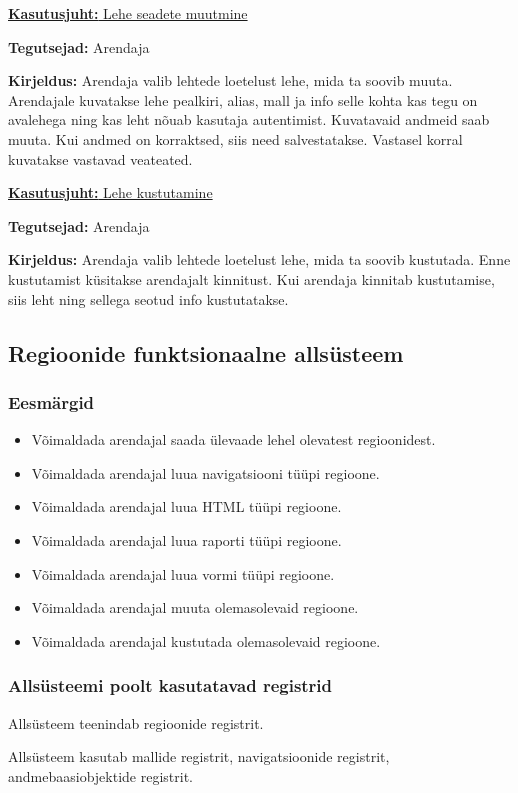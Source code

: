 \documentclass[a4paper,12pt]{article} %
\begin{document}
\underline{\textbf{Kasutusjuht:} Lehe seadete muutmine}
\par
\textbf{Tegutsejad:} Arendaja
\par
\textbf{Kirjeldus:} Arendaja valib lehtede loetelust lehe, mida ta soovib muuta. Arendajale kuvatakse lehe pealkiri, alias, mall ja info selle kohta kas tegu on avalehega ning kas leht nõuab kasutaja autentimist. Kuvatavaid andmeid saab muuta. Kui andmed on korraktsed, siis need salvestatakse. Vastasel korral kuvatakse vastavad veateated.
\par

\underline{\textbf{Kasutusjuht:} Lehe kustutamine}
\par
\textbf{Tegutsejad:} Arendaja
\par
\textbf{Kirjeldus:} Arendaja valib lehtede loetelust lehe, mida ta soovib kustutada. Enne kustutamist küsitakse arendajalt kinnitust. Kui arendaja kinnitab kustutamise, siis leht ning sellega seotud info kustutatakse.
\par

\subsection{Regioonide funktsionaalne allsüsteem}
\subsubsection{Eesmärgid}
\begin{itemize}
\item Võimaldada arendajal saada ülevaade lehel olevatest regioonidest.
\item Võimaldada arendajal luua navigatsiooni tüüpi regioone.
\item Võimaldada arendajal luua HTML tüüpi regioone.
\item Võimaldada arendajal luua raporti tüüpi regioone.
\item Võimaldada arendajal luua vormi tüüpi regioone.
\item Võimaldada arendajal muuta olemasolevaid regioone.
\item Võimaldada arendajal kustutada olemasolevaid regioone.
\end{itemize}
\subsubsection{Allsüsteemi poolt kasutatavad registrid}
Allsüsteem teenindab regioonide registrit.\par
Allsüsteem kasutab mallide registrit, navigatsioonide registrit, andmebaasiobjektide registrit.
\end{document}
